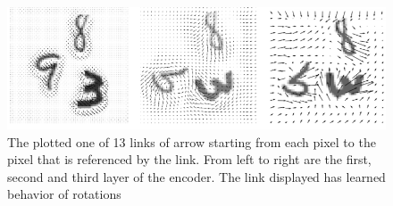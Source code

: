 \documentclass{article}
\begin{document}
\begin{figure}[H]
\centering
\includegraphics[width=\linewidth]{TrajGRU_res}
\caption{The plotted one of 13 links of arrow starting from each pixel to the pixel that is referenced by the link. From left to right are the first, second and third layer of the encoder. The link displayed has learned behavior of rotations}
\end{figure}
\end{document}

